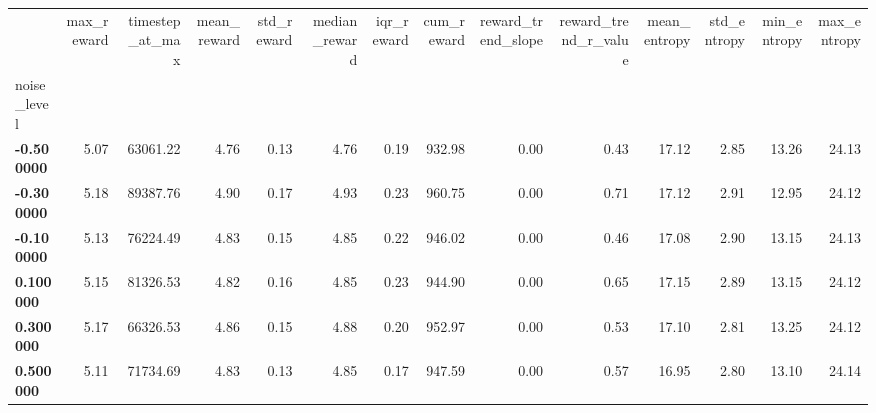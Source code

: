 \begin{tabular}{lrrrrrrrrrrrrr}
\toprule
 & max\_reward & timestep\_at\_max & mean\_reward & std\_reward & median\_reward & iqr\_reward & cum\_reward & reward\_trend\_slope & reward\_trend\_r\_value & mean\_entropy & std\_entropy & min\_entropy & max\_entropy \\
noise_level &  &  &  &  &  &  &  &  &  &  &  &  &  \\
\midrule
\textbf{-0.500000} & 5.07 & 63061.22 & 4.76 & 0.13 & 4.76 & 0.19 & 932.98 & 0.00 & 0.43 & 17.12 & 2.85 & 13.26 & 24.13 \\
\textbf{-0.300000} & 5.18 & 89387.76 & 4.90 & 0.17 & 4.93 & 0.23 & 960.75 & 0.00 & 0.71 & 17.12 & 2.91 & 12.95 & 24.12 \\
\textbf{-0.100000} & 5.13 & 76224.49 & 4.83 & 0.15 & 4.85 & 0.22 & 946.02 & 0.00 & 0.46 & 17.08 & 2.90 & 13.15 & 24.13 \\
\textbf{0.100000} & 5.15 & 81326.53 & 4.82 & 0.16 & 4.85 & 0.23 & 944.90 & 0.00 & 0.65 & 17.15 & 2.89 & 13.15 & 24.12 \\
\textbf{0.300000} & 5.17 & 66326.53 & 4.86 & 0.15 & 4.88 & 0.20 & 952.97 & 0.00 & 0.53 & 17.10 & 2.81 & 13.25 & 24.12 \\
\textbf{0.500000} & 5.11 & 71734.69 & 4.83 & 0.13 & 4.85 & 0.17 & 947.59 & 0.00 & 0.57 & 16.95 & 2.80 & 13.10 & 24.14 \\
\bottomrule
\end{tabular}
